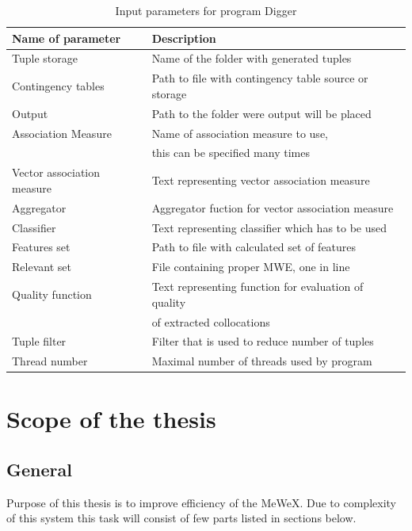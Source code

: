 \begin{table}[t]
    \centering
    \begin{tabular*}{\textwidth}{|l @{\extracolsep{\fill}} l|}
        \hline 
        \textbf{Name of parameter} & \textbf{Description} \\
        \hline
        Tuple storage & Name of the folder with generated tuples \\
        \hline
        Contingency tables & Path to file with contingency table source or storage \\
        \hline
        Output & Path to the folder were output will be placed \\
        \hline
        Association Measure & Name of association measure to use, \\& this can be specified many times \\
        \hline
        Vector association measure & Text representing vector association measure \\
        \hline
        Aggregator & Aggregator fuction for vector association measure \\
        \hline
        Classifier & Text representing classifier which has to be used \\
        \hline
        Features set & Path to file with calculated set of features \\
        \hline
        Relevant set & File containing proper MWE, one in line \\
        \hline
        Quality function & Text representing function for evaluation of quality \\& of extracted collocations \\
        \hline
        Tuple filter & Filter that is used to reduce number of tuples \\
        \hline
        Thread number & Maximal number of threads used by program \\
        \hline
    \end{tabular*} 
    \caption{Input parameters for program Digger}
    \label{tbl_workflow2}
\end{table}

\section{Scope of the thesis}

\subsection{General}
Purpose of this thesis is to improve efficiency of the MeWeX. Due to complexity of this system this task 
will consist of few parts listed in sections below.

